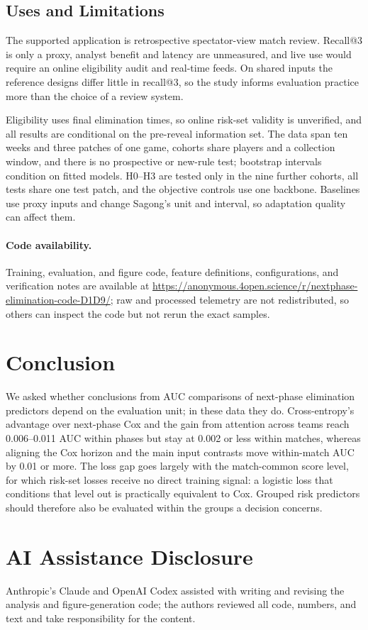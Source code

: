 \documentclass[sigconf,anonymous]{acmart}
\newcommand{\artifacturl}{\url{https://anonymous.4open.science/r/nextphase-elimination-code-D1D9/}}
\begin{document}
\subsection{Uses and Limitations}
\label{sec:discussion:limits}
The supported application is retrospective spectator-view match review. Recall@3 is only a proxy, analyst benefit and latency are unmeasured, and live use would require an online eligibility audit and real-time feeds. On shared inputs the reference designs differ little in recall@3, so the study informs evaluation practice more than the choice of a review system.

Eligibility uses final elimination times, so online risk-set validity is unverified, and all results are conditional on the pre-reveal information set. The data span ten weeks and three patches of one game, cohorts share players and a collection window, and there is no prospective or new-rule test; bootstrap intervals condition on fitted models. H0--H3 are tested only in the nine further cohorts, all tests share one test patch, and the objective controls use one backbone. Baselines use proxy inputs and change Sagong's unit and interval, so adaptation quality can affect them.

\paragraph{Code availability.}
Training, evaluation, and figure code, feature definitions, configurations, and verification notes are available at \artifacturl{}; raw and processed telemetry are not redistributed, so others can inspect the code but not rerun the exact samples.

\section{Conclusion}
\label{sec:conclusion}
We asked whether conclusions from AUC comparisons of next-phase elimination predictors depend on the evaluation unit; in these data they do. Cross-entropy's advantage over next-phase Cox and the gain from attention across teams reach 0.006--0.011 AUC within phases but stay at 0.002 or less within matches, whereas aligning the Cox horizon and the main input contrasts move within-match AUC by 0.01 or more. The loss gap goes largely with the match-common score level, for which risk-set losses receive no direct training signal: a logistic loss that conditions that level out is practically equivalent to Cox. Grouped risk predictors should therefore also be evaluated within the groups a decision concerns.

\section*{AI Assistance Disclosure}
Anthropic's Claude and OpenAI Codex assisted with writing and revising the analysis and figure-generation code; the authors reviewed all code, numbers, and text and take responsibility for the content.



\end{document}
